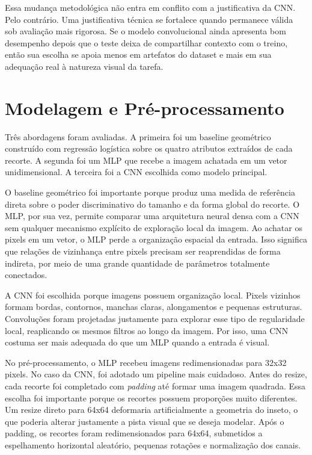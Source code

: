 \documentclass[12pt]{article}
\begin{document}
Essa mudança metodológica não entra em conflito com a justificativa da CNN.
Pelo contrário. Uma justificativa técnica se fortalece quando permanece válida
sob avaliação mais rigorosa. Se o modelo convolucional ainda apresenta bom
desempenho depois que o teste deixa de compartilhar contexto com o treino,
então sua escolha se apoia menos em artefatos do dataset e mais em sua
adequação real à natureza visual da tarefa.

\section{Modelagem e Pré-processamento}

Três abordagens foram avaliadas. A primeira foi um baseline geométrico
construído com regressão logística sobre os quatro atributos extraídos de cada
recorte. A segunda foi um MLP que recebe a imagem achatada em um vetor
unidimensional. A terceira foi a CNN escolhida como modelo principal.

O baseline geométrico foi importante porque produz uma medida de referência
direta sobre o poder discriminativo do tamanho e da forma global do recorte. O
MLP, por sua vez, permite comparar uma arquitetura neural densa com a CNN sem
qualquer mecanismo explícito de exploração local da imagem. Ao achatar os
pixels em um vetor, o MLP perde a organização espacial da entrada. Isso
significa que relações de vizinhança entre pixels precisam ser reaprendidas de
forma indireta, por meio de uma grande quantidade de parâmetros totalmente
conectados.

A CNN foi escolhida porque imagens possuem organização local. Pixels vizinhos
formam bordas, contornos, manchas claras, alongamentos e pequenas estruturas.
Convoluções foram projetadas justamente para explorar esse tipo de regularidade
local, reaplicando os mesmos filtros ao longo da imagem. Por isso, uma CNN
costuma ser mais adequada do que um MLP quando a entrada é visual.

No pré-processamento, o MLP recebeu imagens redimensionadas para 32x32 pixels.
No caso da CNN, foi adotado um pipeline mais cuidadoso. Antes do resize, cada
recorte foi completado com \textit{padding} até formar uma imagem quadrada.
Essa escolha foi importante porque os recortes possuem proporções muito
diferentes. Um resize direto para 64x64 deformaria artificialmente a geometria
do inseto, o que poderia alterar justamente a pista visual que se deseja
modelar. Após o padding, os recortes foram redimensionados para 64x64,
submetidos a espelhamento horizontal aleatório, pequenas rotações e
normalização dos canais.
\end{document}
